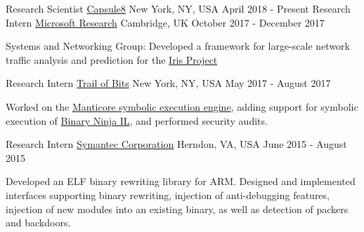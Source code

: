 

\begin{cventries}

  \cventry
    {Research Scientist}
		{\href{https://capsule8.com/}{Capsule8}} %
    {New York, NY, USA}
    {April 2018 - Present}
    {
    }
\vspace{0.1in}
  \cventry
    {Research Intern}
		{\href{https://www.microsoft.com/en-us/research/lab/microsoft-research-cambridge/}{Microsoft Research}} %
    {Cambridge, UK}
    {October 2017 - December 2017}
    {
      \begin{cvitems} %
      \item {Systems and Networking Group: Developed a framework for
          large-scale network traffic analysis and prediction for the
              \href{https://www.microsoft.com/en-us/research/project/iris}{Iris Project}}
      \end{cvitems}
    }

\vspace{0.1in}

\cventry
    {Research Intern} %
		{\href{May 2017 - August 2017}{Trail of Bits}} %
    {New York, NY, USA}
    {May 2017 - August 2017}
    {
      \begin{cvitems} %
      \item {Worked on the \href{https://github.com/trailofbits/manticore}{Manticore symbolic execution engine}, adding support
          for symbolic execution of \href{https://binary.ninja/}{Binary Ninja IL}, and performed security audits.}
      \end{cvitems}
    }

\vspace{0.1in}

  \cventry
    {Research Intern} %
		{\href{May 2015 - August 2015}{Symantec Corporation}} %
    {Herndon, VA, USA}
    {June 2015 - August 2015}
    {
      \begin{cvitems} %
        \item {Developed an ELF binary rewriting library for ARM. Designed and
            implemented interfaces supporting binary rewriting, injection of
              anti-debugging features, injection of new modules into an existing
              binary, as well as detection of packers and backdoors.}
      \end{cvitems}
    }



\end{cventries}
